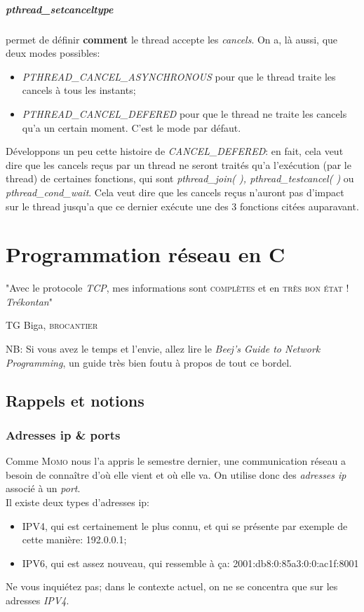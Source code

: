 \documentclass{report}
\begin{document}
\paragraph{pthread\_setcanceltype} permet de définir \textbf{comment} le thread accepte les \emph{cancels}. On a, là aussi, que deux modes possibles:
\begin{itemize}
\item{\emph{PTHREAD\_CANCEL\_ASYNCHRONOUS} pour que le thread traite les cancels à tous les instants;}
\item{\emph{PTHREAD\_CANCEL\_DEFERED} pour que le thread ne traite les cancels qu'a un certain moment. C'est le mode par défaut.}
\end{itemize}
Développons un peu cette histoire de \emph{CANCEL\_DEFERED}: en fait, cela veut dire que les cancels reçus par un thread ne seront traités qu'a l'exécution (par le thread) de certaines fonctions, qui sont \emph{pthread\_join( ), pthread\_testcancel( )} ou \emph{pthread\_cond\_wait}. Cela veut dire que les cancels reçus n'auront pas d'impact sur le thread jusqu'a que ce dernier exécute une des 3 fonctions citées auparavant.



\chapter{Programmation réseau en C}

\epigraph{"Avec le protocole \emph{TCP}, mes informations sont \textsc{complètes} et en \textsc{très bon état} ! \emph{Trékontan}"}{TG Biga, \textsc{brocantier}}

NB: Si vous avez le temps et l'envie, allez lire le \emph{Beej's Guide to Network Programming}, un guide très bien foutu à propos de tout ce bordel.

\section{Rappels et notions}
\subsection{Adresses ip \& ports}
Comme \textsc{Momo} nous l'a appris le semestre dernier, une communication réseau a besoin de connaître d'où elle vient et où elle va. On utilise donc des \emph{adresses ip} associé à un \emph{port}.\\
Il existe deux types d'adresses ip:
\begin{itemize}
\item{IPV4, qui est certainement le plus connu, et qui se présente par exemple de cette manière: 192.0.0.1;}
\item{IPV6, qui est assez nouveau, qui ressemble à ça: 2001:db8:0:85a3:0:0:ac1f:8001} 
\end{itemize}
Ne vous inquiétez pas; dans le contexte actuel, on ne se concentra que sur les adresses \emph{IPV4}.
\end{document}
